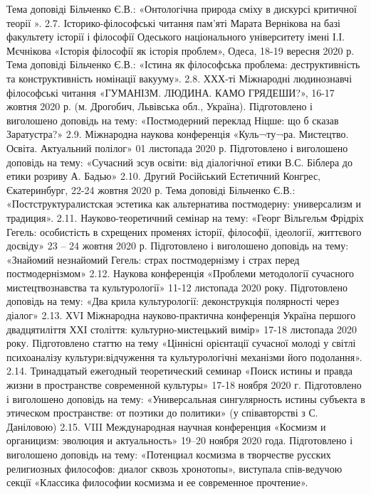 Тема доповіді Більченко Є.В.: «Онтологічна природа сміху в дискурсі критичної теорії ». 
2.7. Історико-філософські читання пам’яті Марата Вернікова на базі факультету історії і філософії Одеського національного університету імені І.І. Мєчнікова «Історія філософії як історія проблем», Одеса, 18-19 вересня 2020 р. Тема доповіді Більченко Є.В.: «Істина як філософська проблема: деструктивність та конструктивність номінації вакууму».
2.8. ХХХ-ті Міжнародні людинознавчі філософські читання «ГУМАНІЗМ. ЛЮДИНА. КАМО ГРЯДЕШИ?», 16-17 жовтня 2020  р. (м. Дрогобич, Львівська обл., Україна). Підготовлено і виголошено доповідь на тему: «Постмодерний переклад Ніцше: що б сказав Заратустра?»
2.9. Міжнародна наукова конференція «Куль¬ту¬ра. Мистецтво. Освіта. Актуальний полілог» 01 листопада 2020 р. Підготовлено і виголошено доповідь на тему: «Сучасний зсув освіти: від діалогічної етики В.С. Біблера  до етики розриву А. Бадью»
2.10. Другий Російський Естетичний Конгрес, Єкатеринбург, 22-24 жовтня 2020 р.  Тема доповіді Більченко Є.В.: «Постструктуралистская эстетика как альтернатива постмодерну: универсализм и традиция». 
2.11. Науково-теоретичний семінар на тему: «Георг Вільгельм Фрідріх Гегель: особистість в схрещених променях історії, філософії, ідеології, життєвого досвіду» 23 – 24 жовтня 2020 р. Підготовлено і виголошено доповідь на тему: «Знайомий незнайомий Гегель: страх постмодернізму і страх перед постмодернізмом»
2.12. Наукова конференція «Проблеми методології сучасного мистецтвознавства та культурології» 11-12 листопада 2020 року. Підготовлено доповідь на тему: «Два крила культурології: деконструкція полярності через діалог»
2.13. ХVІ Міжнародна науково-практична конференція Україна першого двадцятиліття  ХХІ   століття: культурно-мистецький вимір» 17-18 листопада 2020 року. Підготовлено статтю на тему «Ціннісні орієнтації сучасної молоді у світлі психоаналізу культури:відчуження та культурологічні механізми його подолання».
2.14. Тринадцатый ежегодный теоретический семинар  «Поиск истины и правда жизни в пространстве современной культуры» 17-18 ноября 2020 г. Підготовлено і виголошено доповідь на тему: «Универсальная сингулярность истины субъекта в этическом пространстве: от поэтики до политики»  (у співавторстві з С. Даніловою)
2.15. VIII Международная научная конференция «Космизм и органицизм: эволюция и актуальность» 19–20 ноября 2020 года. Підготовлено і виголошено доповідь на тему: «Потенциал космизма  в творчестве русских религиозных философов: диалог сквозь хронотопы», виступала спів-ведучою секції «Классика философии космизма и ее современное прочтение».
